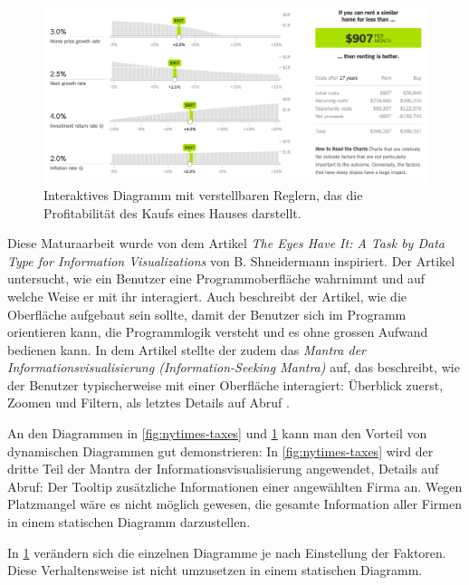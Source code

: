 \begin{figure}[!htbp]
	\centering
	\includegraphics[width=\linewidth]{images/nytimes-realestate-zugeschnitten}
	\caption[Interaktives Diagramm in The New York Times]{Interaktives Diagramm mit verstellbaren Reglern, das die Profitabilität des Kaufs eines Hauses darstellt. \cite{nytimes-realestate}}
	\label{fig:nytimes-realestate}
\end{figure}


Diese Maturaarbeit wurde von dem Artikel \textit{The Eyes Have It: A Task by Data Type for Information Visualizations} von B. Shneidermann \cite{shneiderman} inspiriert. Der Artikel untersucht, wie ein Benutzer eine Programmoberfläche wahrnimmt und auf welche Weise er mit ihr interagiert. Auch beschreibt der Artikel, wie die Oberfläche aufgebaut sein sollte, damit der Benutzer sich im Programm orientieren kann, die Programmlogik versteht und es ohne grossen Aufwand bedienen kann. In dem Artikel stellte der zudem das \textit{Mantra der Informationsvisualisierung (Information-Seeking Mantra)} auf, das beschreibt, wie der Benutzer typischerweise mit einer Oberfläche interagiert: Überblick zuerst, Zoomen und Filtern, als letztes Details auf Abruf \cite{shneiderman}.

An den Diagrammen in \ref{fig:nytimes-taxes} und \ref{fig:nytimes-realestate} kann man den Vorteil von dynamischen Diagrammen gut demonstrieren: In \ref{fig:nytimes-taxes} wird der dritte Teil der Mantra der Informationsvisualisierung angewendet, Details auf Abruf: Der Tooltip zusätzliche Informationen einer angewählten Firma an. Wegen Platzmangel wäre es nicht möglich gewesen, die gesamte Information aller Firmen in einem statischen Diagramm darzustellen.

In \ref{fig:nytimes-realestate} verändern sich die einzelnen Diagramme je nach Einstellung der Faktoren. Diese Verhaltensweise ist nicht umzusetzen in einem statischen Diagramm.

